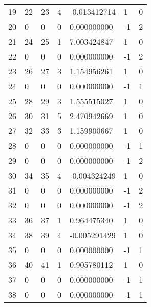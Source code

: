 \documentclass[11pt]{article}
\begin{document}
\begin{tabular}{r|llllll}
	19 & 22           & 23           & 4            & -0.013412714 &  1           & 0           \\
	20 &  0           &  0           & 0            &  0.000000000 & -1           & 2           \\
	21 & 24           & 25           & 1            &  7.003424847 &  1           & 0           \\
	22 &  0           &  0           & 0            &  0.000000000 & -1           & 2           \\
	23 & 26           & 27           & 3            &  1.154956261 &  1           & 0           \\
	24 &  0           &  0           & 0            &  0.000000000 & -1           & 1           \\
	25 & 28           & 29           & 3            &  1.555515027 &  1           & 0           \\
	26 & 30           & 31           & 5            &  2.470942669 &  1           & 0           \\
	27 & 32           & 33           & 3            &  1.159900667 &  1           & 0           \\
	28 &  0           &  0           & 0            &  0.000000000 & -1           & 1           \\
	29 &  0           &  0           & 0            &  0.000000000 & -1           & 2           \\
	30 & 34           & 35           & 4            & -0.004324249 &  1           & 0           \\
	31 &  0           &  0           & 0            &  0.000000000 & -1           & 2           \\
	32 &  0           &  0           & 0            &  0.000000000 & -1           & 2           \\
	33 & 36           & 37           & 1            &  0.964475340 &  1           & 0           \\
	34 & 38           & 39           & 4            & -0.005291429 &  1           & 0           \\
	35 &  0           &  0           & 0            &  0.000000000 & -1           & 1           \\
	36 & 40           & 41           & 1            &  0.905780112 &  1           & 0           \\
	37 &  0           &  0           & 0            &  0.000000000 & -1           & 1           \\
	38 &  0           &  0           & 0            &  0.000000000 & -1           & 1           \\

\end{tabular}
\end{document}
